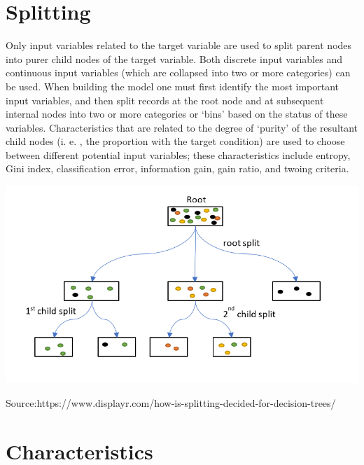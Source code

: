 \documentclass[a0,portrait]{a0poster}
\begin{document}
\begin{multicols}{3}
\color{Black} %

\section*{Splitting}
Only input variables related to the target variable are used to split parent nodes into purer child nodes of the target variable. Both discrete input variables and continuous input variables (which are collapsed into two or more categories) can be used. When building the model one must first identify the most important input variables, and then split records at the root node and at subsequent internal nodes into two or more categories or ‘bins’ based on the status of these variables. Characteristics that are related to the degree of ‘purity’ of the resultant child nodes (i. e. , the proportion with the target condition) are used to choose between different potential input variables; these characteristics include entropy, Gini index, classification error, information gain, gain ratio, and twoing criteria.
\begin{center}\vspace{1cm}
\includegraphics[width=0.8\linewidth]{decision-tree.png}
\caption*{Source:https://www.displayr.com/how-is-splitting-decided-for-decision-trees/}
\end{center}%
\section*{Characteristics}

\end{multicols}
\end{document}
